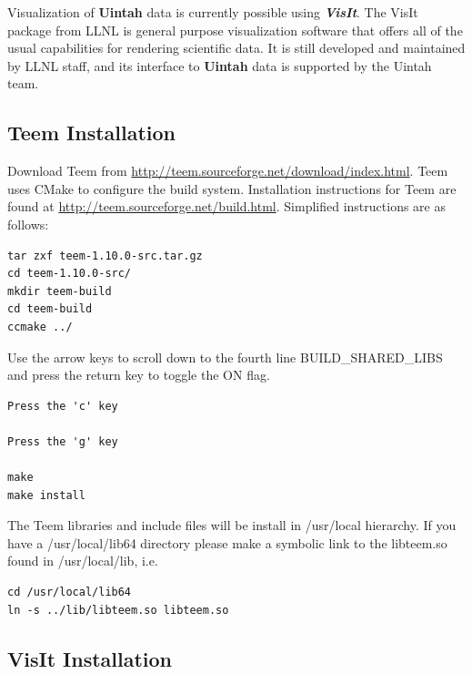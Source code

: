 \documentclass[12pt]{article}
\begin{document}
Visualization of \textbf{Uintah} data is currently possible using
\textbf{\emph{VisIt}}. The VisIt package from LLNL is general purpose
visualization software that offers all of the usual capabilities for
rendering scientific data.  It is still developed and maintained by
LLNL staff, and its interface to \textbf{Uintah} data is supported by
the Uintah team.


\subsection{Teem Installation}
\label{subsec:teem}


Download Teem from
\url{http://teem.sourceforge.net/download/index.html}.  Teem uses
CMake to configure the build system. Installation instructions for
Teem are found at \url{http://teem.sourceforge.net/build.html}.  Simplified
instructions are as follows:

\begin{verbatim}
tar zxf teem-1.10.0-src.tar.gz
cd teem-1.10.0-src/
mkdir teem-build
cd teem-build
ccmake ../
\end{verbatim}

Use the arrow keys to scroll down to the fourth line
BUILD\_SHARED\_LIBS and press the return key to toggle the ON flag.

\begin{verbatim}
Press the 'c' key

Press the 'g' key

make
make install
\end{verbatim}
The Teem libraries and include files will be install in /usr/local
hierarchy.  If you have a /usr/local/lib64 directory please make a
symbolic link to the libteem.so found in /usr/local/lib, i.e.

\begin{verbatim}
cd /usr/local/lib64
ln -s ../lib/libteem.so libteem.so
\end{verbatim}

\subsection{VisIt Installation}
\end{document}
